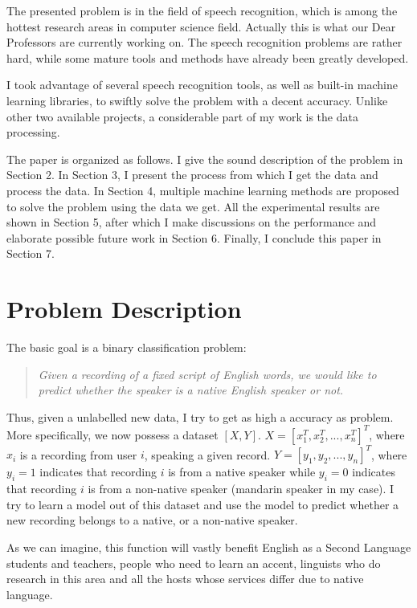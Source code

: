 \documentclass{sig-alternate}
\begin{document}
The presented problem is in the field of speech recognition, which is among the hottest research areas in computer science field. Actually this is what our Dear Professors are currently working on. The speech recognition problems are rather hard, while some mature tools and methods have already been greatly developed.

I took advantage of several speech recognition tools, as well as built-in machine learning libraries, to swiftly solve the problem with a decent accuracy. Unlike other two available projects, a considerable part of my work is the data processing.

The paper is organized as follows. I give the sound description of the problem in Section 2. In Section 3, I present the process from which I get the data and process the data. In Section 4, multiple machine learning methods are proposed to solve the problem using the data we get. All the experimental results are shown in Section 5, after which I make discussions on the performance and elaborate possible future work in Section 6. Finally, I conclude this paper in Section 7.



\section{Problem Description}
The basic goal is a binary classification problem:
\begin{quote}\emph{
	Given a recording of a fixed script of English words, we would like to predict whether the speaker is a native English speaker or not.}
\end{quote}

Thus, given a unlabelled new data, I try to get as high a accuracy as problem. More specifically, we now possess a dataset $[X,Y]$. $X=[x_{1}^{T},x_{2}^{T},...,x_{n}^{T}]^{T}$, where $x_i$ is a recording from user $i$, speaking a given record. $Y=[y_1,y_2,...,y_n]^T$, where $y_i=1$ indicates that recording $i$ is from a native speaker while $y_i=0$ indicates that recording $i$ is from a non-native speaker (mandarin speaker in my case). I try to learn a model out of this dataset and use the model to predict whether a new recording belongs to a native, or a non-native speaker.

As we can imagine, this function will vastly benefit English as a Second Language students and teachers, people who need to learn an accent, linguists who do research in this area and all the hosts whose services differ due to native language.
\end{document}
